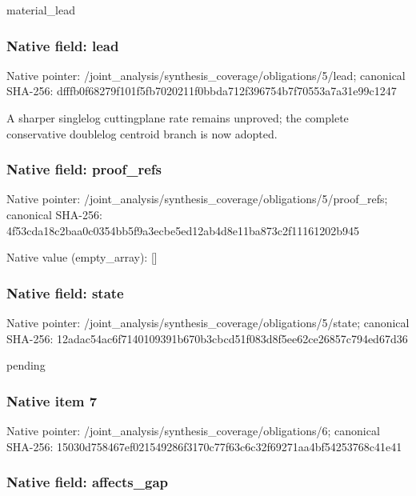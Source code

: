 \documentclass[10pt,a4paper]{article}
\begin{document}
material\_lead


\subsubsection{Native field: lead}


Native pointer: /joint\_analysis/synthesi\allowbreak{}s\_coverage/obligations/5\allowbreak{}/lead; canonical SHA-256: dfffb0f68279f101f5fb7020\allowbreak{}211f0bbda712f396754b7f70\allowbreak{}553a7a31e99c1247


A sharper singlelog cuttingplane rate remains unproved; the complete conservative doublelog centroid branch is now adopted.


\subsubsection{Native field: proof\_refs}


Native pointer: /joint\_analysis/synthesi\allowbreak{}s\_coverage/obligations/5\allowbreak{}/proof\_refs; canonical SHA-256: 4f53cda18c2baa0c0354bb5f\allowbreak{}9a3ecbe5ed12ab4d8e11ba87\allowbreak{}3c2f11161202b945



Native value (empty\_array): []



\subsubsection{Native field: state}


Native pointer: /joint\_analysis/synthesi\allowbreak{}s\_coverage/obligations/5\allowbreak{}/state; canonical SHA-256: 12adac54ac6f7140109391b6\allowbreak{}70b3cbcd51f083d8f5ee62ce\allowbreak{}26857c794ed67d36


pending


\subsubsection{Native item 7}


Native pointer: /joint\_analysis/synthesi\allowbreak{}s\_coverage/obligations/6; canonical SHA-256: 15030d758467ef021549286f\allowbreak{}3170c77f63c6c32f69271aa4\allowbreak{}bf54253768c41e41



\subsubsection{Native field: affects\_gap}
\end{document}
